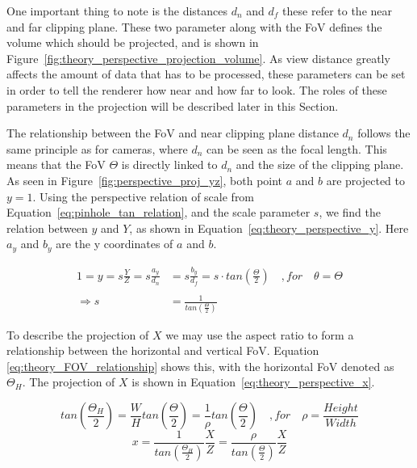 One important thing to note is the distances $d_n$ and $d_f$ these refer to the near and far clipping plane. These two parameter along with the FoV defines the volume which should be projected, and is shown in Figure~\ref{fig:theory_perspective_projection_volume}. As view distance greatly affects the amount of data that has to be processed, these parameters can be set in order to tell the renderer how near and how far to look. The roles of these parameters in the projection will be described later in this Section.

The relationship between the FoV and near clipping plane distance $d_n$ follows the same principle as for cameras, where $d_n$ can be seen as the focal length. This means that the FoV $\Theta$ is directly linked to $d_n$ and the size of the clipping plane. As seen in Figure~\ref{fig:perspective_proj_yz}, both point $a$ and $b$ are projected to $y=1$. Using the perspective relation of scale from Equation~\eqref{eq:pinhole_tan_relation}, and the scale parameter $s$, we find the relation between $y$ and $Y$, as shown in Equation~\eqref{eq:theory_perspective_y}. Here $a_y$ and $b_y$ are the y coordinates of $a$ and $b$.

\begin{equation}
    \begin{aligned}
        1 = y = s \frac{Y}{Z} = s \frac{a_y}{d_n} &= s \frac{b_y}{d_f} = s \cdot tan\left(\frac{\Theta}{2}\right) \quad ,for \quad \theta = \Theta \\\\
        \Rightarrow s &= \frac{1}{tan\left(\frac{\Theta}{2}\right)}
        \label{eq:theory_perspective_y}
    \end{aligned}
\end{equation}

To describe the projection of $X$ we may use the aspect ratio to form a relationship between the horizontal and vertical FoV. Equation \eqref{eq:theory_FOV_relationship} shows this, with the horizontal FoV denoted as $\Theta_H$. The projection of $X$ is shown in Equation~\eqref{eq:theory_perspective_x}.


\begin{equation}
    tan\left(\frac{\Theta_H}{2}\right) = \frac{W}{H}tan\left(\frac{\Theta}{2}\right) = \frac{1}{\rho}tan\left(\frac{\Theta}{2}\right) \quad , for \quad \rho = \frac{Height}{Width}
    \label{eq:theory_FOV_relationship}
\end{equation}
\begin{equation}
    x = \frac{1}{tan\left(\frac{\Theta_H}{2}\right)}\frac{X}{Z} = \frac{\rho}{tan\left(\frac{\Theta}{2}\right)}\frac{X}{Z}
    \label{eq:theory_perspective_x}
\end{equation}


